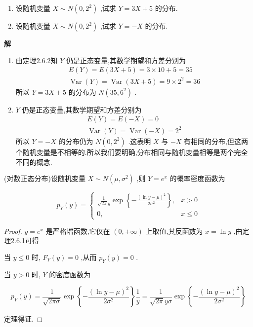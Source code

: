\begin{example}
	\begin{enumerate}
		\item 设随机变量 $ X \sim N\left(0,2^{2}\right) $ ,试求 $ Y=3X+5 $ 的分布.
		\item 设随机变量 $ X \sim N\left(0,2^{2}\right) $ ,试求 $ Y=-X $ 的分布.
	\end{enumerate}
	
	\textbf{解}
	
	\begin{enumerate}
		\item 由定理2.6.2知 $ Y $ 仍是正态变量,其数学期望和方差分别为
		\[
		\begin{array}{l}{E(Y)=E(3 X+5)=3 \times 10+5=35} \\ {\operatorname{Var}(Y)=\operatorname{Var}(3 X+5)=9 \times 2^{2}=36}\end{array}
		\]
		所以 $ Y=3X+5 $ 的分布为 $ N\left(35,6^{2}\right) $ .
		\item $ Y $ 仍是正态变量,其数学期望和方差分别为
		\[
		\begin{array}{l}{E(Y)=E(-X)=0} \\ {\operatorname{Var}(Y)=\operatorname{Var}(-X)=2^{2}}\end{array}
		\]
		所以 $ Y=-X $ 的分布仍为 $ N\left(0,2^{2}\right) $ .这表明 $ X $ 与 $ -X $ 有相同的分布,但这两个随机变量是不相等的.所以我们要明确,分布相同与随机变量相等是两个完全不同的概念.
	\end{enumerate}
\end{example}

\begin{theorem}{}{}
	(对数正态分布)设随机变量 $ X \sim N\left(\mu, \sigma^{2}\right) $ ,则 $ Y=e^{x} $ 的概率密度函数为
	
	\begin{equation}
	p_{Y}(y)=\left\{\begin{array}{ll}{\frac{1}{\sqrt{2 \pi} y} \exp \left\{-\frac{(\ln y-\mu)^{2}}{2 \sigma^{2}}\right\},} & {x>0} \\ {0,} & {x \leqslant 0}\end{array}\right. \label{eq:2.6.2}
	\end{equation}
\end{theorem}

\begin{proof}
	 $ y=e^{x} $ 是严格增函数,它仅在 $ (0,+\infty) $ 上取值,其反函数为 $ x=\ln y $ ,由定理2.6.1可得
	
	当 $ y \leqslant 0 $ 时, $ F_{Y}(y)=0 $ ,从而 $ p_{Y}(y)=0 $ .
	
	当 $ y>0 $ 时, $ Y $ 的密度函数为
	
	\[
	p_{Y}(y)=\frac{1}{\sqrt{2 \pi \sigma}} \exp \left\{-\frac{(\ln y-\mu)^{2}}{2 \sigma^{2}}\right\} \frac{1}{y}=\frac{1}{\sqrt{2 \pi} y \sigma} \exp \left\{-\frac{(\ln y-\mu)^{2}}{2 \sigma^{2}}\right\}
	\]
	
	定理得证.
\end{proof} 


